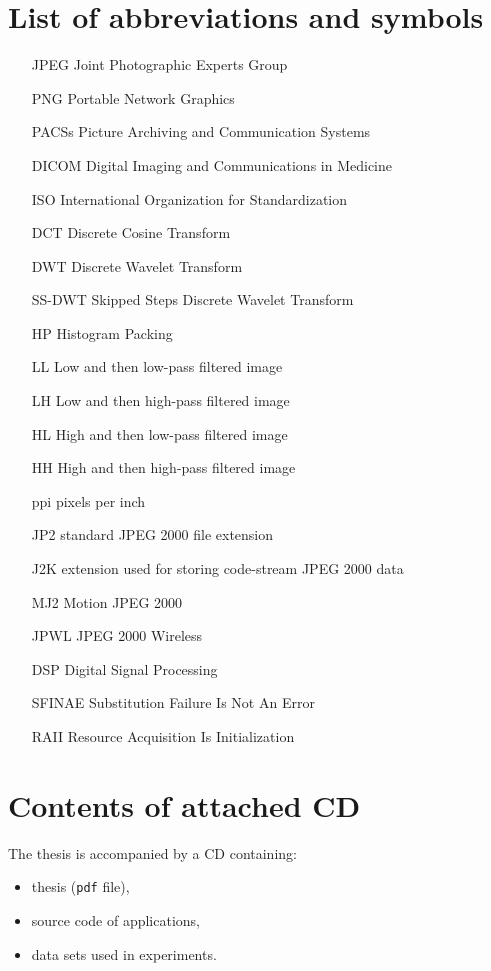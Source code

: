 \chapter*{List of abbreviations and symbols}

\begin{itemize}
\item[JPEG] Joint Photographic Experts Group
\item[PNG] Portable Network Graphics
\item[PACSs] Picture Archiving and Communication Systems
\item[DICOM] Digital Imaging and Communications in Medicine
\item[ISO] International Organization for Standardization
\item[DCT] Discrete Cosine Transform
\item[DWT] Discrete Wavelet Transform
\item[SS-DWT] Skipped Steps Discrete Wavelet Transform
\item[HP] Histogram Packing
\item[LL] Low and then low-pass filtered image
\item[LH] Low and then high-pass filtered image
\item[HL] High and then low-pass filtered image
\item[HH] High and then high-pass filtered image
\item[ppi] pixels per inch
\item[JP2] standard JPEG 2000 file extension
\item[J2K] extension used for storing code-stream JPEG 2000 data
\item[MJ2] Motion JPEG 2000
\item[JPWL] JPEG 2000 Wireless
\item[DSP] Digital Signal Processing
\item[SFINAE] Substitution Failure Is Not An Error
\item[RAII] Resource Acquisition Is Initialization
\end{itemize}

\chapter*{Contents of attached CD}

The thesis is accompanied by a CD containing:
\begin{itemize}
\item thesis (\texttt{pdf} file),
\item source code of applications,
\item data sets used in experiments.
\end{itemize}

